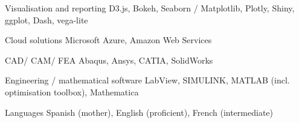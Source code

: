 \begin{cvskills}

\cvskill
{Visualisation and reporting } %
{D3.js, Bokeh, Seaborn / Matplotlib, Plotly, Shiny, ggplot, Dash, vega-lite} %


\cvskill
{Cloud solutions } %
{Microsoft Azure, Amazon Web Services } %



\cvskill
{CAD/ CAM/ FEA} %
{Abaqus, Ansys, CATIA, SolidWorks } %


\cvskill
{Engineering / mathematical software } %
{LabView, SIMULINK, MATLAB (incl. optimisation toolbox), Mathematica } %


\cvskill
{Languages} %
{Spanish (mother), English (proficient), French (intermediate)} %


\end{cvskills}